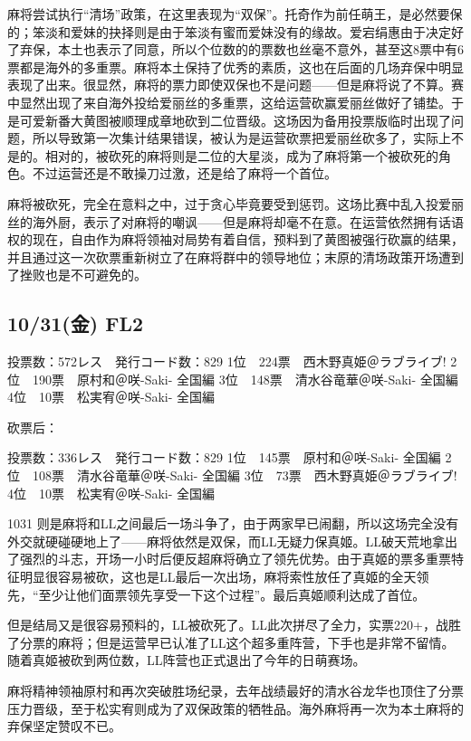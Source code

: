 麻将尝试执行“清场”政策，在这里表现为“双保”。托奇作为前任萌王，是必然要保的；笨淡和爱妹的抉择则是由于笨淡有蜜而爱妹没有的缘故。爱宕绢惠由于决定好了弃保，本土也表示了同意，所以个位数的的票数也丝毫不意外，甚至这8票中有6票都是海外的多重票。麻将本土保持了优秀的素质，这也在后面的几场弃保中明显表现了出来。很显然，麻将的票力即使双保也不是问题——但是麻将说了不算。赛中显然出现了来自海外投给爱丽丝的多重票，这给运营砍赢爱丽丝做好了铺垫。于是可爱新番大黄图被顺理成章地砍到二位晋级。这场因为备用投票版临时出现了问题，所以导致第一次集计结果错误，被认为是运营砍票把爱丽丝砍多了，实际上不是的。相对的，被砍死的麻将则是二位的大星淡，成为了麻将第一个被砍死的角色。不过运营还是不敢操刀过激，还是给了麻将一个首位。

麻将被砍死，完全在意料之中，过于贪心毕竟要受到惩罚。这场比赛中乱入投爱丽丝的海外厨，表示了对麻将的嘲讽——但是麻将却毫不在意。在运营依然拥有话语权的现在，自由作为麻将领袖对局势有着自信，预料到了黄图被强行砍赢的结果，并且通过这一次砍票重新树立了在麻将群中的领导地位；末原的清场政策开场遭到了挫败也是不可避免的。

\subsection{10/31(金) FL2}

    投票数：572レス　発行コード数：829
    1位　224票　西木野真姫＠ラブライブ!
    2位　190票　原村和＠咲-Saki- 全国編
    3位　148票　清水谷竜華＠咲-Saki- 全国編
    4位　10票　松実宥＠咲-Saki- 全国編

砍票后：

    投票数：336レス　発行コード数：829
    1位　145票　原村和＠咲-Saki- 全国編
    2位　108票　清水谷竜華＠咲-Saki- 全国編
    3位　73票　西木野真姫＠ラブライブ!
    4位　10票　松実宥＠咲-Saki- 全国編

1031 则是麻将和LL之间最后一场斗争了，由于两家早已闹翻，所以这场完全没有外交就硬碰硬地上了——麻将依然是双保，而LL无疑力保真姬。LL破天荒地拿出了强烈的斗志，开场一小时后便反超麻将确立了领先优势。由于真姬的票多重票特征明显很容易被砍，这也是LL最后一次出场，麻将索性放任了真姬的全天领先，“至少让他们面票领先享受一下这个过程”。最后真姬顺利达成了首位。

但是结局又是很容易预料的，LL被砍死了。LL此次拼尽了全力，实票220+，战胜了分票的麻将；但是运营早已认准了LL这个超多重阵营，下手也是非常不留情。随着真姬被砍到两位数，LL阵营也正式退出了今年的日萌赛场。

麻将精神领袖原村和再次突破胜场纪录，去年战绩最好的清水谷龙华也顶住了分票压力晋级，至于松实宥则成为了双保政策的牺牲品。海外麻将再一次为本土麻将的弃保坚定赞叹不已。

